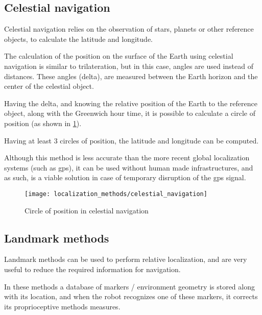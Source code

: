 \subsection{Celestial navigation}

Celestial navigation \cite{Yang2011} relies on the observation of stars, planets or other reference objects, to calculate the latitude and longitude.

The calculation of the position on the surface of the Earth using celestial navigation is similar to trilateration, but in this case, angles are used instead of distances. These angles (delta), are measured between the Earth horizon and the center of the celestial object.

Having the delta, and knowing the relative position of the Earth to the reference object, along with the Greenwich hour time, it is possible to calculate a circle of position (as shown in \cref{fig:localization-methods_celestial-navigation}).

Having at least 3 circles of position, the latitude and longitude can be computed.

Although this method is less accurate than the more recent global localization systems (such as \gls{gps}), it can be used without human made infrastructures, and as such, is a viable solution in case of temporary disruption of the \gls{gps} signal.

\begin{figure}[H]
	\centering
	\texttt{[image: localization\_methods/celestial\_navigation]}
	\caption[Circle of position in celestial navigation]{Circle of position in celestial navigation\protect\footnotemark}
	\label{fig:localization-methods_celestial-navigation}
\end{figure}


\subsection{Landmark methods}

Landmark methods \cite{Lee2006} can be used to perform relative localization, and are very useful to reduce the required information for navigation.

In these methods a database of markers / environment geometry is stored along with its location, and when the robot recognizes one of these markers, it corrects its proprioceptive methods measures.

